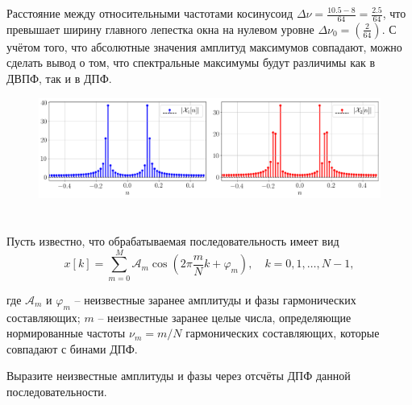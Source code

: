 Расстояние между относительными частотами косинусоид $\Delta \nu = \frac{10.5-8}{64} = \frac{2.5}{64}$, что превышает ширину главного лепестка окна на нулевом уровне $\Delta \nu_0 = \left(\frac{2}{64}\right)$. С учётом того, что абсолютные значения амплитуд максимумов совпадают, можно сделать вывод о том, что спектральные максимумы будут различимы как в ДВПФ, так и в ДПФ.

\begin{figure}[!h]
	\centering
	\includegraphics[width=1.\columnwidth]{pics/spring/2/2-1.png}
	\label{fig:2-1}
\end{figure}



\newpage
\section{}
Пусть известно, что обрабатываемая последовательность имеет вид
\begin{equation*}
x[k] = \sum \limits_{m=0}^{M} \mathcal{A}_m \cos\left(2\pi\frac{m}{N}k + \varphi_m \right),\quad k = 0, 1, \ldots, N-1,
\end{equation*}

где $\mathcal{A}_m$ и $\varphi_m$ -- неизвестные заранее амплитуды и фазы гармонических составляющих;
$m$ -- неизвестные заранее целые числа, определяющие нормированные частоты $\nu_m = m/N$ гармонических составляющих, которые совпадают с бинами ДПФ.

Выразите неизвестные амплитуды и фазы через отсчёты ДПФ данной последовательности.

